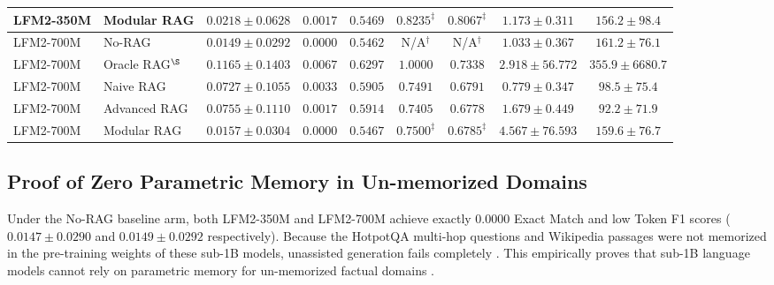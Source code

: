\documentclass[conference]{IEEEtran}
\begin{document}
\begin{table}[t]
\begin{tabular}{llccccccc}
LFM2-350M & Modular RAG & $0.0218 \pm 0.0628$ & $0.0017$ & $0.5469$ & $0.8235^{\ddagger}$ & $\mathbf{0.8067}^{\ddagger}$ & $1.173 \pm 0.311$ & $156.2 \pm 98.4$ \\
\midrule
LFM2-700M & No-RAG & $0.0149 \pm 0.0292$ & $0.0000$ & $0.5462$ & N/A$^{\dagger}$ & N/A$^{\dagger}$ & $1.033 \pm 0.367$ & $161.2 \pm 76.1$ \\
LFM2-700M & Oracle RAG$^{\S}$ & $0.1165 \pm 0.1403$ & $0.0067$ & $\mathbf{0.6297}$ & $1.0000$ & $0.7338$ & $2.918 \pm 56.772$ & $355.9 \pm 6680.7$ \\
LFM2-700M & Naive RAG & $0.0727 \pm 0.1055$ & $0.0033$ & $0.5905$ & $0.7491$ & $0.6791$ & $0.779 \pm 0.347$ & $98.5 \pm 75.4$ \\
LFM2-700M & Advanced RAG & $0.0755 \pm 0.1110$ & $0.0017$ & $0.5914$ & $0.7405$ & $0.6778$ & $1.679 \pm 0.449$ & $92.2 \pm 71.9$ \\
LFM2-700M & Modular RAG & $0.0157 \pm 0.0304$ & $0.0000$ & $0.5467$ & $0.7500^{\ddagger}$ & $0.6785^{\ddagger}$ & $4.567 \pm 76.593$ & $159.6 \pm 76.7$ \\
\bottomrule
\end{tabular}
\end{table}

\subsection{Proof of Zero Parametric Memory in Un-memorized Domains}
Under the No-RAG baseline arm, both LFM2-350M and LFM2-700M achieve exactly $0.0000$ Exact Match and low Token F1 scores ($0.0147 \pm 0.0290$ and $0.0149 \pm 0.0292$ respectively). Because the HotpotQA multi-hop questions and Wikipedia passages were not memorized in the pre-training weights of these sub-1B models, unassisted generation fails completely \cite{mallen2023when}. This empirically proves that sub-1B language models cannot rely on parametric memory for un-memorized factual domains \cite{gao2023retrieval}.
\end{document}
